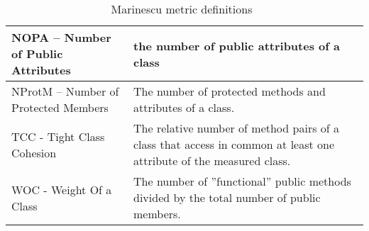 \begin{table}[!h]
\begin{tabular}{L{4cm}|L{12cm}}
 \midrule
 NOPA -- Number of Public Attributes & the number of public attributes of a class \\
 \midrule
 NProtM -- Number of Protected Members & The number of protected methods and attributes of a class. \\
 \midrule
 TCC - Tight Class Cohesion & The relative number of method pairs of a class that access in common at least one attribute of the measured class.\cite{Bieman1995} \\
 \midrule
 WOC - Weight Of a Class & The number of ''functional'' public methods divided by the total number of public members\cite{Marinescu02}.
\end{tabular}
\caption{Marinescu metric definitions~\cite{Lanza2006}}
\label{tab:mmdefs}
\end{table}